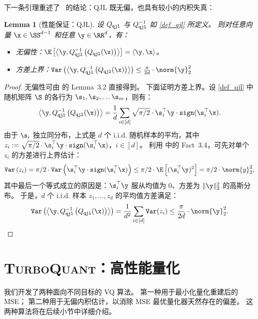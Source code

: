 \documentclass[11pt]{ctexart}
\newtheorem{lemma}{Lemma}
\newcommand{\TurboQuant}{\textsc{TurboQuant}\xspace}
\let\cref\ref
\begin{document}
下一条引理重述了~\cite{qjl} 的结论：QJL 既无偏，也具有较小的内积失真：
\begin{lemma}[性能保证：QJL]\label{lem_qjl}
设 $Q_{\tt qjl}$ 与 $Q_{\tt qjl}^{-1}$ 如 \cref{def_qjl} 所定义。
则对任意向量 $\x \in \SS^{d-1}$ 和任意 $\y \in \RR^d$，有：
\begin{itemize}
    \item 无偏性：$\E\left[ \left< \y, Q_{\tt qjl}^{-1}\left( Q_{\tt qjl}(\x) \right) \right> \right] = \langle \y, \x \rangle$。
    \item 方差上界：$\mathtt{Var} \left( \left< \y, Q_{\tt qjl}^{-1}\left( Q_{\tt qjl}(\x) \right) \right> \right) \le \frac{\pi}{2 d} \cdot \norm{\y}_2^2$
\end{itemize}
\end{lemma}
\begin{proof}
无偏性可由 \cite{qjl} 的 Lemma~3.2 直接得到。
下面证明方差上界。设 \cref{def_qjl} 中随机矩阵 $\S$ 的各行为 $\s_1, \s_2, \ldots \s_m$，则有：
    \[
    \left< \y, Q_{\tt qjl}^{-1}\left( Q_{\tt qjl}(\x) \right) \right> = \frac{1}{d} \sum_{i\in[d]} \sqrt{\pi/2} \cdot \s_i^\top \y \cdot {\tt sign}(\s_i^\top \x).
    \]
    由于 $\s_i$ 独立同分布，上式是 $d$ 个 i.i.d. 随机样本的平均，其中
    $z_i := \sqrt{\pi/2} \cdot \s_i^\top \y \cdot {\tt sign}(\s_i^\top \x)$，$i \in [d]$。
    利用 \cite{qjl} 中的 Fact~3.4，可先对单个 $z_i$ 的方差进行上界估计：
    \begin{equation}\label{eq_moments_estimator}
    \mathtt{Var} \left( z_i \right) = \pi/2 \cdot \mathtt{Var} \left( \s_i^\top \y \cdot {\tt sign}(\s_i^\top \x) \right) \le \pi/2 \cdot \E \left[ (\s_i^\top \y)^2 \right] = \pi/2 \cdot \norm{y}_2^2,
    \end{equation}
    其中最后一个等式成立的原因是：$\s_i^\top \y$ 服从均值为 0、方差为 $\|\y\|_2^2$ 的高斯分布。
    于是，$d$ 个 i.i.d. 样本 $z_1,\ldots,z_d$ 的平均值方差满足：
    \[
    \mathtt{Var} \left( \left< \y, Q_{\tt qjl}^{-1}\left( Q_{\tt qjl}(\x) \right) \right> \right) = \frac{1}{d^2} \sum_{i\in[d]} \mathtt{Var} ( z_i ) \le \frac{\pi}{2 d} \cdot \norm{\y}_2^2.
    \]
\end{proof}

\section{\TurboQuant：高性能量化}
我们开发了两种面向不同目标的 VQ 算法。
第一种用于最小化量化重建后的 MSE；
第二种用于无偏内积估计，以消除 MSE 最优量化器天然存在的偏差。
这两种算法将在后续小节中详细介绍。
\end{document}
